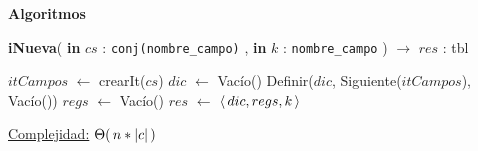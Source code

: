 \documentclass{article}
\newcommand*{\IntIn}[2]{%
    \textbf{in} \ensuremath{#1} : \texttt{#2}%
}
\DeclarePairedDelimiter\abs{\lvert}{\rvert}
\newenvironment{Algoritmos}{%
    \noindent\textbf{\Large Algoritmos}%
}{}
\newcommand*{\sth}[1]{\ensuremath{\Theta(\thinspace#1\thinspace)}}
\newcommand*{\tuple}[1]{\ensuremath{\langle\thinspace#1\thinspace\rangle}}
\begin{document}
\begin{Algoritmos}

    \begin{algorithm}[H]{\textbf{iNueva}(\IntIn{cs}{conj(nombre\_campo)}, \IntIn{k}{nombre\_campo}) $\to$ $res$ : tbl}
        \begin{algorithmic}[1]
        \State $itCampos$ $\gets$ crearIt($cs$)                 \Comment{\sth{1}}
        \State $dic$ $\gets$ Vacío()
        \State Definir($dic$, Siguiente($itCampos$), Vacío())   
        \EndWhile
        \State $regs$ $\gets$ Vacío()
        \State $res$ $\gets$ \tuple{dic, regs, k}               \Comment{\sth{1}}

        \medskip
        \State \underline{Complejidad:} \sth{n*\abs{c}}
        \end{algorithmic}
    \end{algorithm}

\end{Algoritmos}
\end{document}
